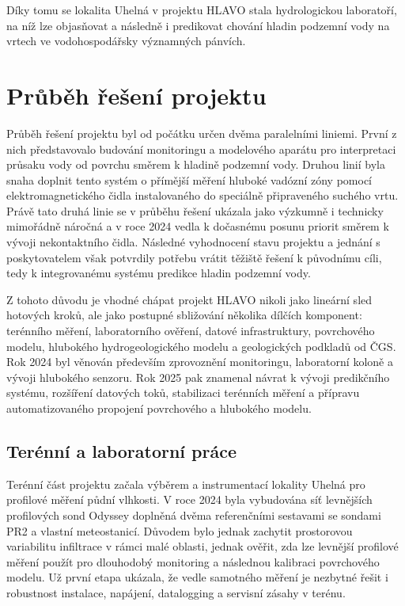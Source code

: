 \documentclass[11pt,a4paper]{article}
\begin{document}
\begin{onehalfspacing}
Díky tomu se lokalita Uhelná v projektu HLAVO stala hydrologickou laboratoří,
na níž lze objasňovat a následně i predikovat chování hladin podzemní vody na
vrtech ve vodohospodářsky významných pánvích.

\section{Průběh řešení projektu}
\label{sec:prubeh}
Průběh řešení projektu byl od počátku určen dvěma paralelními liniemi.
První z nich představovalo budování monitoringu a modelového aparátu pro
interpretaci průsaku vody od povrchu směrem k hladině podzemní vody.
Druhou linií byla snaha doplnit tento systém o přímější měření hluboké
vadózní zóny pomocí elektromagnetického čidla instalovaného do speciálně
připraveného suchého vrtu. Právě tato druhá linie se v průběhu řešení ukázala
jako výzkumně i technicky mimořádně náročná a v roce 2024 vedla k dočasnému
posunu priorit směrem k vývoji nekontaktního čidla. Následné vyhodnocení stavu
projektu a jednání s poskytovatelem však potvrdily potřebu vrátit těžiště
řešení k původnímu cíli, tedy k integrovanému systému predikce hladin
podzemní vody.

Z tohoto důvodu je vhodné chápat projekt HLAVO nikoli jako lineární sled
hotových kroků, ale jako postupné sbližování několika dílčích komponent:
terénního měření, laboratorního ověření, datové infrastruktury, povrchového
modelu, hlubokého hydrogeologického modelu a geologických podkladů od ČGS.
Rok 2024 byl věnován především zprovoznění monitoringu, laboratorní koloně a
vývoji hlubokého senzoru. Rok 2025 pak znamenal návrat k vývoji predikčního
systému, rozšíření datových toků, stabilizaci terénních měření a přípravu
automatizovaného propojení povrchového a hlubokého modelu.

\subsection{Terénní a laboratorní práce}
Terénní část projektu začala výběrem a instrumentací lokality Uhelná pro
profilové měření půdní vlhkosti. V roce 2024 byla vybudována síť levnějších
profilových sond Odyssey doplněná dvěma referenčními sestavami se sondami
PR2 a vlastní meteostanicí. Důvodem bylo jednak zachytit prostorovou
variabilitu infiltrace v rámci malé oblasti, jednak ověřit, zda lze levnější
profilové měření použít pro dlouhodobý monitoring a následnou kalibraci
povrchového modelu. Už první etapa ukázala, že vedle samotného měření je
nezbytné řešit i robustnost instalace, napájení, datalogging a servisní
zásahy v terénu.


\end{onehalfspacing}
\end{document}
